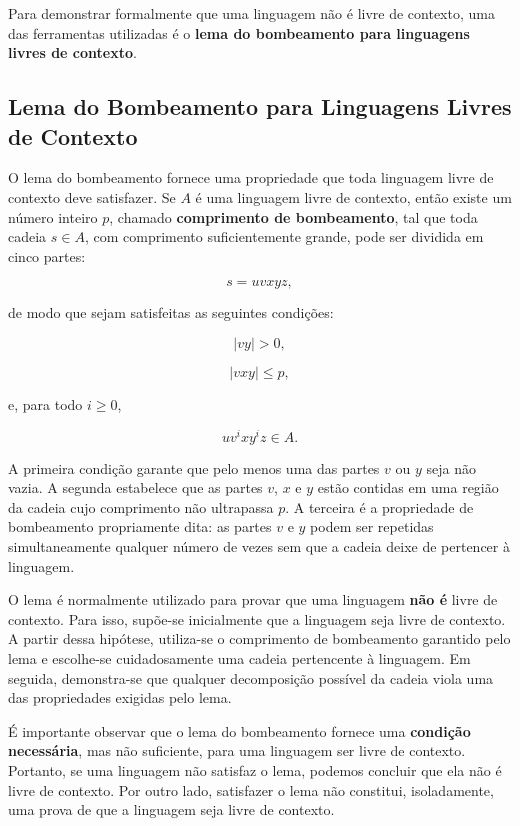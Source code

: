 \documentclass[
  brazilian,
  letterpaper,
]{book}
\theoremstyle{plain}
\theoremstyle{definition}
\theoremstyle{remark}
\begin{document}
Para demonstrar formalmente que uma linguagem não é livre de contexto,
uma das ferramentas utilizadas é o \textbf{lema do bombeamento para
linguagens livres de contexto}.

\subsection{Lema do Bombeamento para Linguagens Livres de
Contexto}\label{lema-do-bombeamento-para-linguagens-livres-de-contexto}

O lema do bombeamento fornece uma propriedade que toda linguagem livre
de contexto deve satisfazer. Se \(A\) é uma linguagem livre de contexto,
então existe um número inteiro \(p\), chamado \textbf{comprimento de
bombeamento}, tal que toda cadeia \(s\in A\), com comprimento
suficientemente grande, pode ser dividida em cinco partes:

\[
s=uvxyz,
\]

de modo que sejam satisfeitas as seguintes condições:

\[
|vy|>0,
\]

\[
|vxy|\leq p,
\]

e, para todo \(i\geq0\),

\[
uv^ixy^iz\in A.
\]

A primeira condição garante que pelo menos uma das partes \(v\) ou \(y\)
seja não vazia. A segunda estabelece que as partes \(v\), \(x\) e \(y\)
estão contidas em uma região da cadeia cujo comprimento não ultrapassa
\(p\). A terceira é a propriedade de bombeamento propriamente dita: as
partes \(v\) e \(y\) podem ser repetidas simultaneamente qualquer número
de vezes sem que a cadeia deixe de pertencer à linguagem.

O lema é normalmente utilizado para provar que uma linguagem \textbf{não
é} livre de contexto. Para isso, supõe-se inicialmente que a linguagem
seja livre de contexto. A partir dessa hipótese, utiliza-se o
comprimento de bombeamento garantido pelo lema e escolhe-se
cuidadosamente uma cadeia pertencente à linguagem. Em seguida,
demonstra-se que qualquer decomposição possível da cadeia viola uma das
propriedades exigidas pelo lema.

É importante observar que o lema do bombeamento fornece uma
\textbf{condição necessária}, mas não suficiente, para uma linguagem ser
livre de contexto. Portanto, se uma linguagem não satisfaz o lema,
podemos concluir que ela não é livre de contexto. Por outro lado,
satisfazer o lema não constitui, isoladamente, uma prova de que a
linguagem seja livre de contexto.
\end{document}
